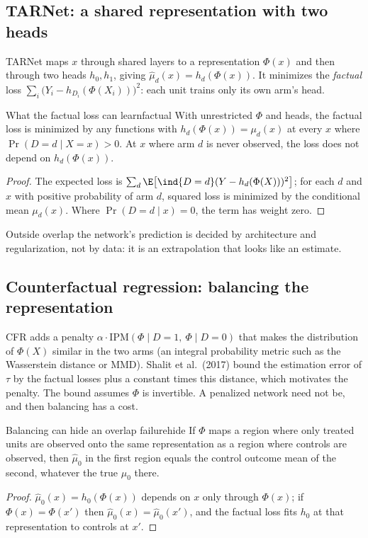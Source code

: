 \documentclass[11pt]{article}
\begin{document}
\subsection{TARNet: a shared representation with two heads}

TARNet maps $x$ through shared layers to a representation $\Phi(x)$ and then through two heads $h_0, h_1$, giving
$\hat\mu_d(x) = h_d(\Phi(x))$. It minimizes the \emph{factual} loss
$\sum_i \big(Y_i - h_{D_i}(\Phi(X_i))\big)^2$: each unit trains only its own arm's head.

\begin{prop}{What the factual loss can learn}{factual}
With unrestricted $\Phi$ and heads, the factual loss is minimized by any functions with $h_d(\Phi(x)) = \mu_d(x)$ at
every $x$ where $\Pr(D = d \mid X = x) > 0$. At $x$ where arm $d$ is never observed, the loss does not depend on
$h_d(\Phi(x))$.
\end{prop}
\begin{proof}
The expected loss is $\sum_d \E\big[\ind{D=d}(Y - h_d(\Phi(X)))^2\big]$; for each $d$ and $x$ with positive
probability of arm $d$, squared loss is minimized by the conditional mean $\mu_d(x)$. Where $\Pr(D=d \mid x) = 0$, the
term has weight zero.
\end{proof}

Outside overlap the network's prediction is decided by architecture and regularization, not by data: it is an
extrapolation that looks like an estimate.

\subsection{Counterfactual regression: balancing the representation}

CFR adds a penalty $\alpha \cdot \text{IPM}(\Phi \mid D=1,\ \Phi \mid D=0)$ that makes the distribution of $\Phi(X)$ similar
in the two arms (an integral probability metric such as the Wasserstein distance or MMD). Shalit et al.\ (2017) bound the estimation error of $\tau$ by the factual losses plus a constant times this distance, which
motivates the penalty. The bound assumes $\Phi$ is invertible. A penalized network need not be, and then balancing has
a cost.

\begin{prop}{Balancing can hide an overlap failure}{hide}
If $\Phi$ maps a region where only treated units are observed onto the same representation as a region where
controls are observed, then $\hat\mu_0$ in the first region equals the control outcome mean of the second, whatever
the true $\mu_0$ there.
\end{prop}
\begin{proof}
$\hat\mu_0(x) = h_0(\Phi(x))$ depends on $x$ only through $\Phi(x)$; if $\Phi(x) = \Phi(x')$ then $\hat\mu_0(x) = \hat\mu_0(x')$, and
the factual loss fits $h_0$ at that representation to controls at $x'$.
\end{proof}
\end{document}
